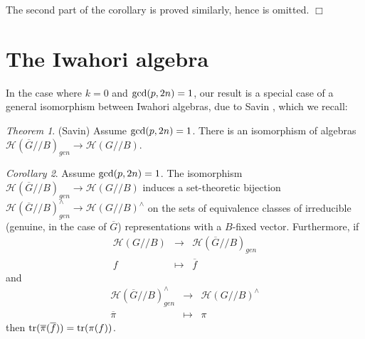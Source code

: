 \documentclass[12pt,letterpaper]{amsart}
\theoremstyle{definition}
\theoremstyle{remark}
\newtheorem{theorem}{Theorem}
\newtheorem{corollary}[theorem]{Corollary}
\begin{document}
The second part of the corollary is proved similarly,
hence is omitted.
$\Box$

\section{The Iwahori algebra}
\label{section:savin}

In the case where $k=0$ and ${\rm gcd}(p,2n)=1$, 
our result is a special
case of a general isomorphism between Iwahori algebras,
due to Savin \cite{S}, which we recall:

\begin{theorem} (Savin) Assume ${\rm gcd}(p,2n)=1$.
There is an isomorphism
of algebras
$\mathcal{H}(\overline{G}//B)_{gen}\rightarrow \mathcal{H}(G//B)$.
\end{theorem}

\begin{corollary}
 Assume ${\rm gcd}(p,2n)=1$. The isomorphism
$\mathcal{H}(\overline{G}//B)_{gen}\rightarrow \mathcal{H}(G//B)$
induces a set-theoretic 
bijection $\mathcal{H}(\overline{G}//B)_{gen}^\wedge
\rightarrow \mathcal{H}(G//B)^\wedge$ on the sets of equivalence
classes of irreducible (genuine, in the case of $\overline{G}$)
representations with a $B$-fixed vector.
Furthermore, if
\[
\begin{array}{ccc}
\mathcal{H}(G//B)&\rightarrow &\mathcal{H}(\overline{G}//B)_{gen}\\
f & \longmapsto &\overline{f}
\end{array}
\]
and 
\[
\begin{array}{ccc}
\mathcal{H}(\overline{G}//B)_{gen}^\wedge &\rightarrow &\mathcal{H}(G//B)^\wedge\\
\overline{\pi}&\longmapsto &\pi
\end{array}
\]
then ${\rm tr}(\overline{\pi}(\overline{f}))={\rm tr}(\pi(f))$.
\end{corollary}

\end{document}
